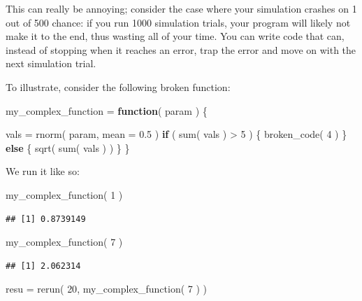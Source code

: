 \documentclass[
]{book}
\newenvironment{Shaded}{\begin{snugshade}}{\end{snugshade}}
\newcommand{\AttributeTok}[1]{\textcolor[rgb]{0.77,0.63,0.00}{#1}}
\newcommand{\ControlFlowTok}[1]{\textcolor[rgb]{0.13,0.29,0.53}{\textbf{#1}}}
\newcommand{\DecValTok}[1]{\textcolor[rgb]{0.00,0.00,0.81}{#1}}
\newcommand{\FloatTok}[1]{\textcolor[rgb]{0.00,0.00,0.81}{#1}}
\newcommand{\FunctionTok}[1]{\textcolor[rgb]{0.00,0.00,0.00}{#1}}
\newcommand{\NormalTok}[1]{#1}
\newcommand{\OtherTok}[1]{\textcolor[rgb]{0.56,0.35,0.01}{#1}}
\newcommand{\SpecialCharTok}[1]{\textcolor[rgb]{0.00,0.00,0.00}{#1}}
\begin{document}
This can really be annoying; consider the case where your simulation crashes on 1 out of 500 chance: if you run 1000 simulation trials, your program will likely not make it to the end, thus wasting all of your time.
You can write code that can, instead of stopping when it reaches an error, trap the error and move on with the next simulation trial.

To illustrate, consider the following broken function:

\begin{Shaded}
\begin{Highlighting}[]
\NormalTok{my\_complex\_function }\OtherTok{=} \ControlFlowTok{function}\NormalTok{( param ) \{}
    
\NormalTok{    vals }\OtherTok{=} \FunctionTok{rnorm}\NormalTok{( param, }\AttributeTok{mean =} \FloatTok{0.5}\NormalTok{ )}
    \ControlFlowTok{if}\NormalTok{ ( }\FunctionTok{sum}\NormalTok{( vals ) }\SpecialCharTok{\textgreater{}} \DecValTok{5}\NormalTok{ ) \{}
        \FunctionTok{broken\_code}\NormalTok{( }\DecValTok{4}\NormalTok{ )}
\NormalTok{    \} }\ControlFlowTok{else}\NormalTok{ \{}
        \FunctionTok{sqrt}\NormalTok{( }\FunctionTok{sum}\NormalTok{( vals ) )}
\NormalTok{    \}}
\NormalTok{\}}
\end{Highlighting}
\end{Shaded}

We run it like so:

\begin{Shaded}
\begin{Highlighting}[]
\FunctionTok{my\_complex\_function}\NormalTok{( }\DecValTok{1}\NormalTok{ )}
\end{Highlighting}
\end{Shaded}

\begin{verbatim}
## [1] 0.8739149
\end{verbatim}

\begin{Shaded}
\begin{Highlighting}[]
\FunctionTok{my\_complex\_function}\NormalTok{( }\DecValTok{7}\NormalTok{ )}
\end{Highlighting}
\end{Shaded}

\begin{verbatim}
## [1] 2.062314
\end{verbatim}

\begin{Shaded}
\begin{Highlighting}[]
\NormalTok{resu }\OtherTok{=} \FunctionTok{rerun}\NormalTok{( }\DecValTok{20}\NormalTok{, }\FunctionTok{my\_complex\_function}\NormalTok{( }\DecValTok{7}\NormalTok{ ) )}
\end{Highlighting}
\end{Shaded}
\end{document}
